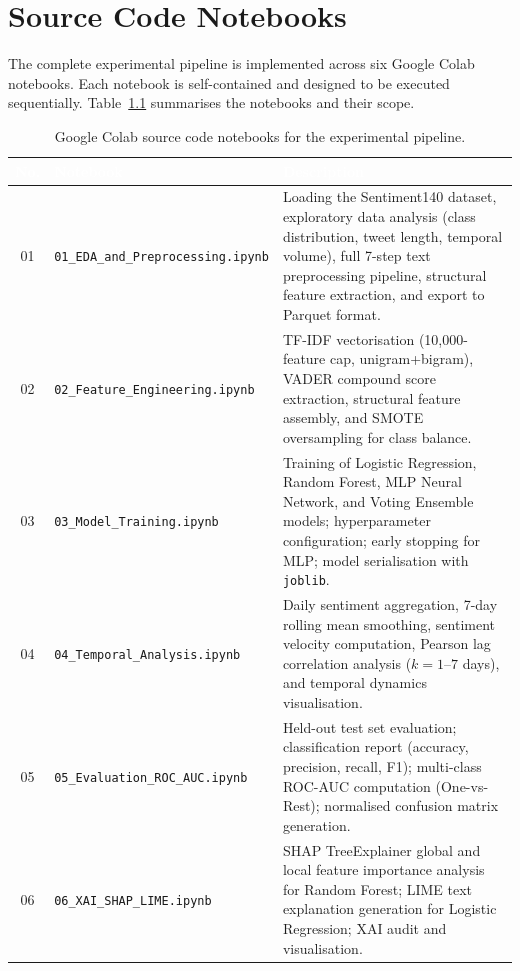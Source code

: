 \chapter{Source Code Notebooks}
\label{app:notebooks}

The complete experimental pipeline is implemented across six Google Colab notebooks. Each notebook is self-contained and designed to be executed sequentially. Table~\ref{tab:notebooks} summarises the notebooks and their scope.

\begin{table}[H]
\centering
\caption{Google Colab source code notebooks for the experimental pipeline.}
\label{tab:notebooks}
\begin{tabular}{@{}clp{7cm}@{}}
  \toprule
  \rowcolor{uwsblue!90}
  \textcolor{white}{\textbf{No.}} &
  \textcolor{white}{\textbf{Notebook}} &
  \textcolor{white}{\textbf{Description}} \\
  \midrule
  \rowcolor{tablegrey}
  01 & \texttt{01\_EDA\_and\_Preprocessing.ipynb} & Loading the Sentiment140 dataset, exploratory data analysis (class distribution, tweet length, temporal volume), full 7-step text preprocessing pipeline, structural feature extraction, and export to Parquet format. \\
  02 & \texttt{02\_Feature\_Engineering.ipynb} & TF-IDF vectorisation (10,000-feature cap, unigram+bigram), VADER compound score extraction, structural feature assembly, and SMOTE oversampling for class balance. \\
  \rowcolor{tablegrey}
  03 & \texttt{03\_Model\_Training.ipynb} & Training of Logistic Regression, Random Forest, MLP Neural Network, and Voting Ensemble models; hyperparameter configuration; early stopping for MLP; model serialisation with \texttt{joblib}. \\
  04 & \texttt{04\_Temporal\_Analysis.ipynb} & Daily sentiment aggregation, 7-day rolling mean smoothing, sentiment velocity computation, Pearson lag correlation analysis ($k = 1$--$7$ days), and temporal dynamics visualisation. \\
  \rowcolor{tablegrey}
  05 & \texttt{05\_Evaluation\_ROC\_AUC.ipynb} & Held-out test set evaluation; classification report (accuracy, precision, recall, F1); multi-class ROC-AUC computation (One-vs-Rest); normalised confusion matrix generation. \\
  06 & \texttt{06\_XAI\_SHAP\_LIME.ipynb} & SHAP TreeExplainer global and local feature importance analysis for Random Forest; LIME text explanation generation for Logistic Regression; XAI audit and visualisation. \\
  \bottomrule
\end{tabular}
\end{table}


